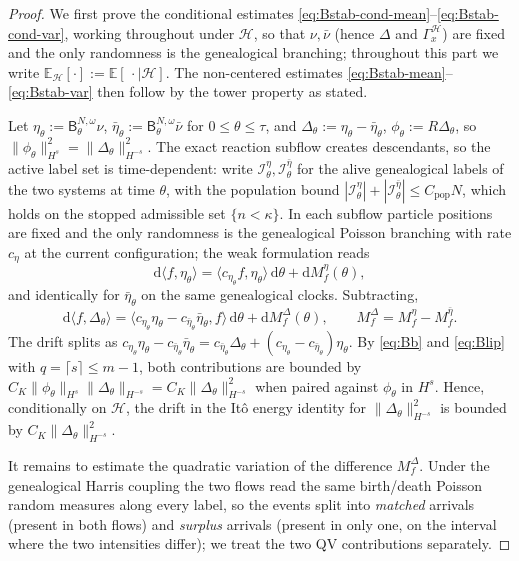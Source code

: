 \documentclass[a4paper,fleqn]{cas-sc}
\theoremstyle{definition}
\theoremstyle{remark}
\begin{document}
\begin{proof}
We first prove the conditional estimates
\eqref{eq:Bstab-cond-mean}--\eqref{eq:Bstab-cond-var}, working throughout under
$\mathcal H$, so that $\nu,\bar\nu$ (hence $\Delta$ and $\Gamma_x^{\mathcal H}$)
are fixed and the only randomness is the genealogical branching; throughout this part we
write $\mathbb E_{\mathcal H}[\cdot]:=\mathbb E[\,\cdot\mid\mathcal H]$. The non-centered
estimates \eqref{eq:Bstab-mean}--\eqref{eq:Bstab-var} then follow by the tower
property as stated.

Let $\eta_\theta:=\mathsf B^{N,\omega}_\theta\nu$,
$\bar\eta_\theta:=\mathsf B^{N,\omega}_\theta\bar\nu$ for $0\le\theta\le\tau$, and
$\Delta_\theta:=\eta_\theta-\bar\eta_\theta$, $\phi_\theta:=R\Delta_\theta$, so
$\|\phi_\theta\|_{H^s}^2=\|\Delta_\theta\|_{H^{-s}}^2$. The exact reaction subflow
creates descendants, so the active label set is time-dependent: write
$\mathcal I^\eta_\theta,\mathcal I^{\bar\eta}_\theta$ for the alive genealogical
labels of the two systems at time $\theta$, with the population bound
$|\mathcal I^\eta_\theta|+|\mathcal I^{\bar\eta}_\theta|\le C_{\mathrm{pop}}N$, which holds on the
stopped admissible set $\{n<\kappa\}$. In each
subflow particle positions are fixed and the only randomness is the genealogical
Poisson branching with rate $c_\eta$ at the current configuration; the weak
formulation reads
\[
\mathrm d\langle f,\eta_\theta\rangle
=\langle c_{\eta_\theta}f,\eta_\theta\rangle\,\mathrm d\theta
+\mathrm dM^\eta_f(\theta),
\]
and identically for $\bar\eta_\theta$ on the same genealogical clocks. Subtracting,
\[
\mathrm d\langle f,\Delta_\theta\rangle
=\langle c_{\eta_\theta}\eta_\theta-c_{\bar\eta_\theta}\bar\eta_\theta,f\rangle\,\mathrm d\theta
+\mathrm dM^\Delta_f(\theta),
\qquad M^\Delta_f=M^\eta_f-M^{\bar\eta}_f.
\]
The drift splits as
$c_{\eta_\theta}\eta_\theta-c_{\bar\eta_\theta}\bar\eta_\theta
=c_{\bar\eta_\theta}\Delta_\theta+(c_{\eta_\theta}-c_{\bar\eta_\theta})\eta_\theta$.
By \eqref{eq:Bb} and \eqref{eq:Blip} with $q=\lceil s\rceil\le m-1$, both
contributions are bounded by $C_K\|\phi_\theta\|_{H^s}\|\Delta_\theta\|_{H^{-s}}
=C_K\|\Delta_\theta\|_{H^{-s}}^2$ when paired against $\phi_\theta$ in $H^s$. Hence,
conditionally on $\mathcal H$, the drift in the It\^o energy identity for
$\|\Delta_\theta\|_{H^{-s}}^2$ is bounded by $C_K\|\Delta_\theta\|_{H^{-s}}^2$.

It remains to estimate the quadratic variation of the difference $M^\Delta_f$.
Under the genealogical Harris coupling the two flows read the same birth/death
Poisson random measures along every label, so the events split into
\emph{matched} arrivals (present in both flows) and \emph{surplus} arrivals
(present in only one, on the interval where the two intensities differ); we treat
the two QV contributions separately.


\end{proof}
\end{document}
